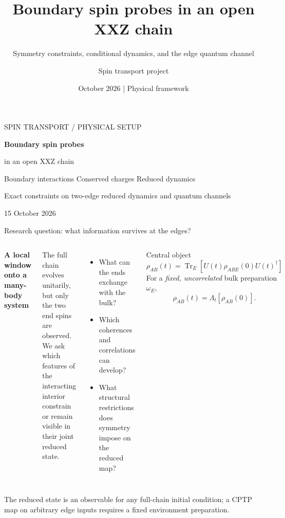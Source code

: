 \documentclass[aspectratio=169,10pt]{beamer}
\title{Boundary spin probes in an open XXZ chain}
\subtitle{Symmetry constraints, conditional dynamics, and the edge quantum channel}
\author{Spin transport project}
\date{October 2026 \;|\; Physical framework}
\newcommand{\Tr}{\operatorname{Tr}}
\newcommand{\sechead}[1]{{\color{sea}\bfseries #1}\par\vspace{1mm}}
\newcommand{\noteinline}[1]{{\color{muted}\footnotesize #1}}
\begin{document}
\begin{frame}[plain]
  \vspace{1.05cm}
  {\color{sea}\large SPIN TRANSPORT \; / \; PHYSICAL SETUP}\par\vspace{.42cm}
  {\color{ink}\bfseries\fontsize{25}{29}\selectfont Boundary spin probes\par in an open XXZ chain}\par\vspace{.30cm}
  {\color{muted}\large Boundary interactions \;\textbullet\; Conserved charges \;\textbullet\; Reduced dynamics}\par
  \vfill
  {\color{muted}\small Exact constraints on two-edge reduced dynamics and quantum channels}\par
  {\color{sea}\small 15 October 2026}
\end{frame}

\begin{frame}{Research question: what information survives at the edges?}
\begin{columns}[T,onlytextwidth]
\sechead{A local window onto a many-body system}
The full chain evolves unitarily, but only the two end spins are observed. We ask which features of the interacting interior constrain or remain visible in their joint reduced state.
\begin{itemize}\setlength\itemsep{5pt}
  \item What can the ends exchange with the bulk?
  \item Which coherences and correlations can develop?
  \item What structural restrictions does symmetry impose on the reduced map?
\end{itemize}
\begin{block}{Central object}
\[\rho_{AB}(t)=\Tr_{E}\!\left[U(t)\rho_{ABE}(0)U(t)^\dagger\right]\]
\smallskip
For a \emph{fixed, uncorrelated} bulk preparation \(\omega_E\),
\[\rho_{AB}(t)=\Lambda_t[\rho_{AB}(0)].\]
\end{block}
\end{columns}
\smallskip
\noteinline{The reduced state is an observable for any full-chain initial condition; a CPTP map on arbitrary edge inputs requires a fixed environment preparation.}
\end{frame}
\end{document}
